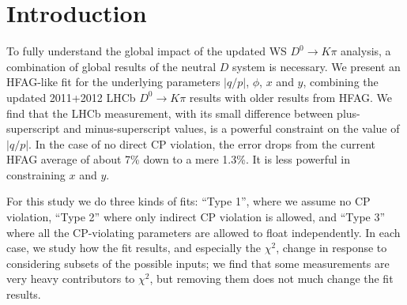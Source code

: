 
\section{Introduction}
\label{sec:Introduction}
To fully understand the global impact of the updated WS $D^0\to K\pi$ analysis, 
a combination of global results of the neutral $D$ system is necessary. We present
an HFAG-like fit for the underlying parameters $|q/p|$, $\phi$, $x$ and $y$, combining
the updated 2011+2012 LHCb $D^0\to K\pi$ results with older results from HFAG. We find that the LHCb measurement,
with its small difference between plus-superscript and minus-superscript values,
is a powerful constraint on the value of $|q/p|$. In the case of no direct CP violation,
the error drops from the current HFAG average of about 7\% down to a mere 1.3\%. 
It is less powerful in constraining $x$ and $y$.

For this study we do three kinds of fits: ``Type 1'', where we assume no CP violation,
``Type 2'' where only indirect CP violation is allowed, and ``Type 3'' where all the
CP-violating parameters are allowed to float independently. In each case, we study
how the fit results, and especially the $\chi^2$, change in response to considering
subsets of the possible inputs; we find that some measurements are very heavy contributors
to $\chi^2$, but removing them does not much change the fit results. 



